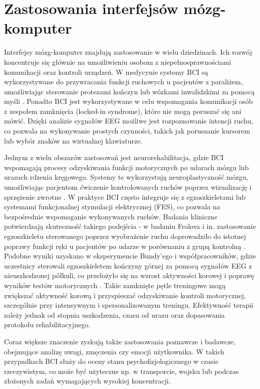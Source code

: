 \section{Zastosowania interfejsów mózg-komputer}

Interfejsy mózg-komputer znajdują zastosowanie w wielu dziedzinach. Ich rozwój koncentruje się głównie na umożliwieniu osobom z niepełnosprawnościami komunikacji oraz kontroli urządzeń. W medycynie systemy BCI są wykorzystywane do przywracania funkcji ruchowych u pacjentów z paraliżem, umożliwiając sterowanie protezami kończyn lub wózkami inwalidzkimi za pomocą myśli \cite{hochberg2012}. Ponadto BCI jest wykorzystywane w celu wspomagania komunikacji osób z zespołem zamknięcia (locked-in syndrome), które nie mogą poruszać się ani mówić. Dzięki analizie sygnałów EEG możliwe jest rozpoznawanie intencji ruchu, co pozwala na wykonywanie prostych czynności, takich jak poruszanie kursorem lub wybór znaków na wirtualnej klawiaturze. 

Jednym z wielu obszarów zastosowań jest neurorehabilitacja, gdzie BCI wspomagają procesy odzyskiwania funkcji motorycznych po udarach mózgu lub urazach rdzenia kręgowego. Systemy te wykorzystują neuroplastyczność mózgu, umożliwiając pacjentom ćwiczenie kontrolowanych ruchów poprzez wizualizację i sprzężenie zwrotne \cite{dobkin2007}. W praktyce BCI często integruje się z egzoszkieletami lub systemami funkcjonalnej stymulacji elektrycznej (FES), co pozwala na bezpośrednie wspomaganie wykonywanych ruchów.
Badania kliniczne potwierdzają skuteczność takiego podejścia - w badaniu Frolova i in. zastosowanie egzoszkieletu sterowanego poprzez wyobrażenie ruchu doprowadziło do istotnej poprawy funkcji ręki u pacjentów po udarze w porównaniu z grupą kontrolną \cite{frolov2017}. Podobne wyniki uzyskano w eksperymencie Bundy'ego i współpracowników, gdzie uczestnicy sterowali egzoszkieletem kończyny górnej za pomocą sygnałów EEG z nieuszkodzonej półkuli, co przełożyło się na wzrost aktywności korowej i poprawę wyników testów motorycznych \cite{bundy2017}. Takie zamknięte pętle treningowe mogą zwiększać aktywność korową i przyspieszać odzyskiwanie kontroli motorycznej, szczególnie przy intensywnym i spersonalizowanym treningu. Efektywność terapii zależy jednak od stopnia uszkodzenia, czasu od urazu oraz dopasowania protokołu rehabilitacyjnego.

Coraz większe znaczenie zyskują także zastosowania poznawcze i badawcze, obejmujące analizę uwagi, zmęczenia czy emocji użytkownika. W takich przypadkach BCI służy do oceny stanu psychofizjologicznego w czasie rzeczywistym, co może być użyteczne np. w transporcie, wojsku lub podczas złożonych zadań wymagających wysokiej koncentracji.

